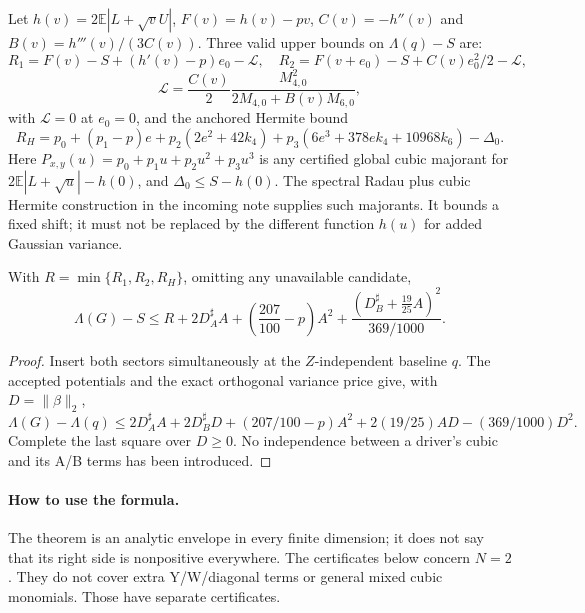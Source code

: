 Let $h(v)=2\mathbb E|L+\sqrt vU|$, $F(v)=h(v)-pv$,
$C(v)=-h''(v)$ and $B(v)=h'''(v)/(3C(v))$. Three valid upper bounds
on $\Lambda(q)-S$ are:
\[
 R_1=F(v)-S+(h'(v)-p)e_0-\mathcal L,\quad
 R_2=F(v+e_0)-S+C(v)e_0^2/2-\mathcal L,
\]
\[
 \mathcal L=\frac{C(v)}2
       \frac{M_{4,0}^2}{2M_{4,0}+B(v)M_{6,0}},
\]
with $\mathcal L=0$ at $e_0=0$, and the anchored Hermite bound
\[
 R_H=p_0+(p_1-p)e+p_2(2e^2+42k_4)
       +p_3(6e^3+378ek_4+10968k_6)-\Delta_0.
\]
Here $P_{x,y}(u)=p_0+p_1u+p_2u^2+p_3u^3$ is any certified
global cubic majorant for
$2\mathbb E|L+\sqrt u|-h(0)$, and $\Delta_0\le S-h(0)$.
The spectral Radau plus cubic Hermite construction in the incoming
note supplies such majorants. It bounds a fixed shift; it must not
be replaced by the different function $h(u)$ for added Gaussian variance.

\begin{theorem}
\label{thm:kcompact-envelope}
With $R=\min\{R_1,R_2,R_H\}$, omitting any unavailable candidate,
\[
 \boxed{\Lambda(G)-S\le
 R+2D_A^\sharp A+
 \left(\frac{207}{100}-p\right)A^2+
 \frac{\left(D_B^\sharp+\frac{19}{25}A\right)^2}{369/1000}.}
\]
\end{theorem}
\begin{proof}
Insert both sectors simultaneously at the $Z$-independent baseline
$q$. The accepted potentials and the exact orthogonal variance price give,
with $D=\|\beta\|_2$,
\[
 \Lambda(G)-\Lambda(q)
 \le 2D_A^\sharp A+2D_B^\sharp D+
 (207/100-p)A^2+2(19/25)AD-(369/1000)D^2.
\]
Complete the last square over $D\ge0$. No independence between a
driver's cubic and its A/B terms has been introduced.
\end{proof}

\paragraph{How to use the formula.}
The theorem is an analytic envelope in every finite dimension; it
does not say that its right side is nonpositive everywhere. The
certificates below concern $N=2$. They do not cover extra Y/W/diagonal
terms or general mixed cubic monomials. Those have separate certificates.

